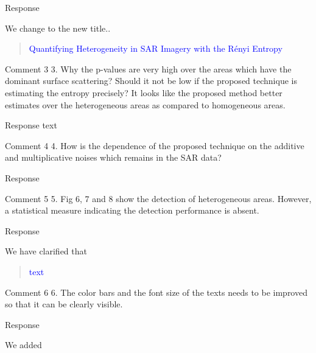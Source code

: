 \documentclass[11pt]{report}
\begin{document}
\begin{responsebox}{Response}

We change to the new title..
\begin{quote}
	\textcolor{blue}{
	Quantifying Heterogeneity in SAR Imagery with the Rényi Entropy
}
\end{quote}
\end{responsebox}

\vspace{2em}
\begin{reviewbox}{Comment 3}
3. Why the p-values are very high over the areas which have the dominant surface scattering? Should it not be low if the proposed technique is estimating the entropy precisely? It looks like the proposed method better estimates over the heterogeneous areas as compared to homogeneous areas.
\end{reviewbox}
\begin{responsebox}{Response}
	text
\end{responsebox}

\vspace{2em}
\begin{reviewbox}{Comment 4}
4. How is the dependence of the proposed technique on the additive and multiplicative noises which remains in the SAR data?
\end{reviewbox}
\begin{responsebox}{Response}


\end{responsebox}

\vspace{2em}
\begin{reviewbox}{Comment 5}
5. Fig 6, 7 and 8 show the detection of heterogeneous areas. However, a statistical measure indicating the detection performance is absent.
\end{reviewbox}
\begin{responsebox}{Response}


We have clarified  that
\begin{quote}
	\textcolor{blue}{text}
\end{quote}
\end{responsebox}

\vspace{2em}
\begin{reviewbox}{Comment 6}
6. The color bars and the font size of the texts needs to be improved so that it can be clearly visible.
\end{reviewbox}
\begin{responsebox}{Response}

We added 

	

\end{responsebox}
\end{document}
